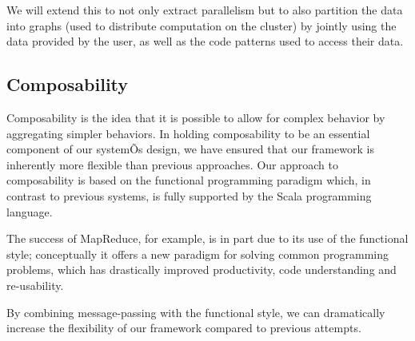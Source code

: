 \documentclass[acmtocl]{acmtrans2m}
\begin{document}
We will extend this to not only extract parallelism but to also partition the data into graphs (used to distribute computation on the cluster) by jointly using the data provided by the user, as well as the code patterns used to access their data.

\subsection{Composability}
Composability is the idea that it is possible to allow for complex behavior by aggregating simpler behaviors. In holding composability to be an essential component of our systemÕs design, we have ensured that our framework is inherently more flexible than previous approaches. Our approach to composability is based on the functional programming paradigm which, in contrast to previous systems, is fully supported by the Scala programming language.

The success of MapReduce, for example, is in part due to its use of the functional style; conceptually it offers a new paradigm for solving common programming problems, which has drastically improved productivity, code understanding and re-usability.

By combining message-passing with the functional style, we can dramatically increase the flexibility of our framework compared to previous attempts.

%
%
%
\end{document}
